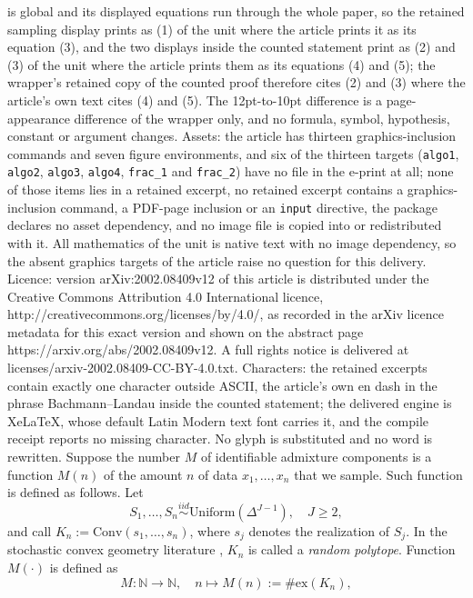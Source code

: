 \documentclass[10pt,a4paper]{amsart}
\theoremstyle{plain}
\begin{document}
is global and its displayed equations run through the whole paper, so the retained sampling display prints as (1) of the unit where the article prints it as its equation (3), and the two displays inside the counted statement print as (2) and (3) of the unit where the article prints them as its equations (4) and (5); the wrapper's retained copy of the counted proof therefore cites (2) and (3) where the article's own text cites (4) and (5). The 12pt-to-10pt difference is a page-appearance difference of the wrapper only, and no formula, symbol, hypothesis, constant or argument changes. Assets: the article has thirteen graphics-inclusion commands and seven figure environments, and six of the thirteen targets (\texttt{algo1}, \texttt{algo2}, \texttt{algo3}, \texttt{algo4}, \texttt{frac\_1} and \texttt{frac\_2}) have no file in the e-print at all; none of those items lies in a retained excerpt, no retained excerpt contains a graphics-inclusion command, a PDF-page inclusion or an \texttt{input} directive, the package declares no asset dependency, and no image file is copied into or redistributed with it. All mathematics of the unit is native text with no image dependency, so the absent graphics targets of the article raise no question for this delivery. Licence: version arXiv:2002.08409v12 of this article is distributed under the Creative Commons Attribution 4.0 International licence, http://creativecommons.org/licenses/by/4.0/, as recorded in the arXiv licence metadata for this exact version and shown on the abstract page https://arxiv.org/abs/2002.08409v12. A full rights notice is delivered at licenses/arxiv-2002.08409-CC-BY-4.0.txt. Characters: the retained excerpts contain exactly one character outside ASCII, the article's own en dash in the phrase Bachmann--Landau inside the counted statement; the delivered engine is XeLaTeX, whose default Latin Modern text font carries it, and the compile receipt reports no missing character. No glyph is substituted and no word is rewritten.
Suppose the number $M$ of identifiable admixture components is a function $M(n)$ of the amount $n$ of data $x_1,\ldots,x_n$ that we sample. Such function is defined as follows. Let
\begin{equation}\label{eq1_fmm}
S_1,\ldots,S_n \stackrel{iid}{\sim} \mbox{Uniform}(\Delta^{J-1}), \quad J\geq 2,
\end{equation}
and call $K_n:=\text{Conv}(s_1,\ldots,s_n)$, where $s_j$ denotes the realization of $S_j$. In the stochastic convex geometry literature \cite{vu}, $K_n$ is called a \textit{random polytope}. Function $M(\cdot)$ is defined as
$$M:\mathbb{N} \rightarrow \mathbb{N}, \quad n \mapsto M(n):=\#\text{ex}(K_n),$$
\end{document}
